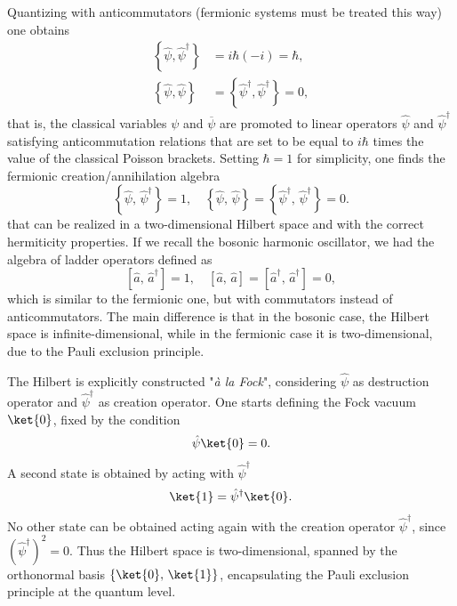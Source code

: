 Quantizing with anticommutators (fermionic systems must be treated this way) one obtains
\[
    \begin{aligned}
        \left\{ \hat{\psi}, \hat{\psi}^{\dagger} \right\} & = i \hbar (-i) = \hbar,                                            \\
        \left\{ \hat{\psi}, \hat{\psi} \right\}           & = \left\{ \hat{\psi}^{\dagger}, \hat{\psi}^{\dagger} \right\} = 0,
    \end{aligned}
\]
that is, the classical variables \(\psi\) and \(\overline{\psi}\) are promoted to linear operators \(\hat{\psi}\) and \(\hat{\psi}^{\dagger}\) satisfying anticommutation relations that are set to be equal to \(i\hbar\) times the value of the classical Poisson brackets. Setting \(\hbar = 1\) for simplicity, one finds the fermionic creation/annihilation algebra
\begin{equation}
    \left\{\hat{\psi},\,\hat{\psi}^{\dagger}\right\} = 1, \quad \left\{\hat{\psi},\,\hat{\psi}\right\} = \left\{\hat{\psi}^{\dagger},\,\hat{\psi}^{\dagger}\right\} = 0.
    \label{eq:fermionic_creation_annihilation_algebra}
\end{equation}
that can be realized in a two-dimensional Hilbert space and with the correct hermiticity properties. If we recall the bosonic harmonic oscillator, we had the algebra of ladder operators defined as
\[
    \left[ \hat{a},\,\hat{a}^{\dagger} \right] = 1, \quad \left[ \hat{a},\,\hat{a} \right] = \left[ \hat{a}^{\dagger},\,\hat{a}^{\dagger} \right] = 0,
\]
which is similar to the fermionic one, but with commutators instead of anticommutators. The main difference is that in the bosonic case, the Hilbert space is infinite-dimensional, while in the fermionic case it is two-dimensional, due to the Pauli exclusion principle.

The Hilbert is explicitly constructed "\textit{à la Fock}", considering \(\hat{\psi}\) as destruction operator and \(\hat{\psi}^{\dagger}\) as creation operator. One starts defining the Fock vacuum \(\ket{0}\), fixed by the condition
\[
    \hat{\psi}\ket{0} = 0.
\]
A second state is obtained by acting with \(\hat{\psi}^{\dagger}\)
\[
    \ket{1} = \hat{\psi}^{\dagger}\ket{0}.
\]
No other state can be obtained acting again with the creation operator \(\hat{\psi}^{\dagger}\), since \((\hat{\psi}^{\dagger})^2 = 0\). Thus the Hilbert space is two-dimensional, spanned by the orthonormal basis \(\{ \ket{0},\,\ket{1} \}\), encapsulating the Pauli exclusion principle at the quantum level.

